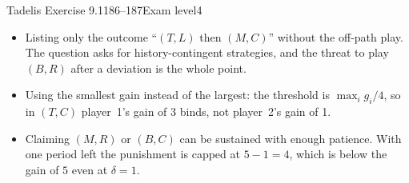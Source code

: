 \begin{exsol}{Tadelis Exercise 9.1}{186--187}{Exam level}{4}
\mistakes
\begin{itemize}
  \item Listing only the outcome ``$(T,L)$ then $(M,C)$'' without the off-path play. The question asks
  for history-contingent strategies, and the threat to play $(B,R)$ after a deviation is the whole
  point.
  \item Using the smallest gain instead of the largest: the threshold is $\max_i g_i/4$, so in $(T,C)$
  player~1's gain of 3 binds, not player~2's gain of 1.
  \item Claiming $(M,R)$ or $(B,C)$ can be sustained with enough patience. With one period left the
  punishment is capped at $5 - 1 = 4$, which is below the gain of $5$ even at $\delta = 1$.
\end{itemize}

\end{exsol}
